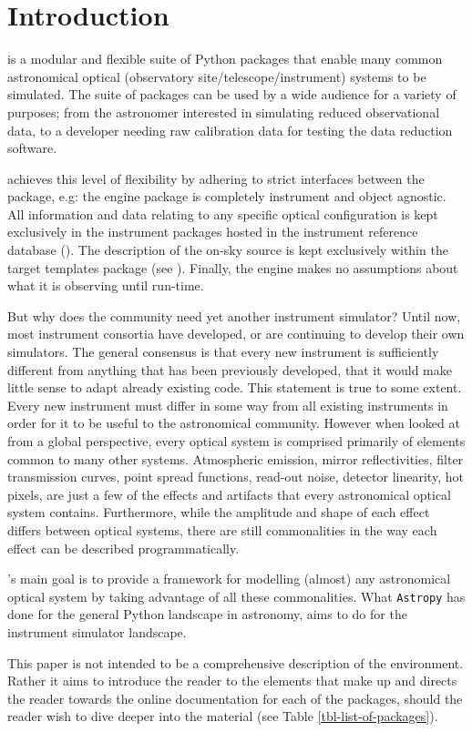 \section{Introduction}
\label{introduction}

\ScopeSim{} is a modular and flexible suite of Python packages that enable many common astronomical optical (observatory site/telescope/instrument) systems to be simulated.
The suite of packages can be used by a wide audience for a variety of purposes; from the astronomer interested in simulating reduced observational data, to a developer needing raw calibration data for testing the data reduction software.

\ScopeSim{} achieves this level of flexibility by adhering to strict interfaces between the package, e.g: the \ScopeSim{} engine package is completely instrument and object agnostic.
All information and data relating to any specific optical configuration is kept exclusively in the instrument packages hosted in the instrument reference database (\IRDB{}).
The description of the on-sky source is kept exclusively within the target templates package (see \ScopeSimtemplates{}).
Finally, the engine makes no assumptions about what it is observing until run-time.

But why does the community need yet another instrument simulator?
Until now, most instrument consortia have developed, or are continuing to develop their own simulators\cite{hsim, schmalzl2012, simcado2016, simcado2019}.
The general consensus is that every new instrument is sufficiently different from anything that has been previously developed, that it would make little sense to adapt already existing code.
This statement is true to some extent.
Every new instrument must differ in some way from all existing instruments in order for it to be useful to the astronomical community.
However when looked at from a global perspective, every optical system is comprised primarily of elements common to many other systems.
Atmospheric emission, mirror reflectivities, filter transmission curves, point spread functions, read-out noise, detector linearity, hot pixels, are just a few of the effects and artifacts that every astronomical optical system contains.
Furthermore, while the amplitude and shape of each effect differs between optical systems, there are still commonalities in the way each effect can be described programmatically.

\ScopeSim{}'s main goal is to provide a framework for modelling (almost) any astronomical optical system by taking advantage of all these commonalities.
What \lstinline{Astropy} has done for the general Python landscape in astronomy, \ScopeSim{} aims to do for the instrument simulator landscape.

This paper is not intended to be a comprehensive description of the \ScopeSim{} environment.
Rather it aims to introduce the reader to the elements that make up \ScopeSim{} and directs the reader towards the online documentation for each of the packages, should the reader wish to dive deeper into the material (see Table \ref{tbl-list-of-packages}).

